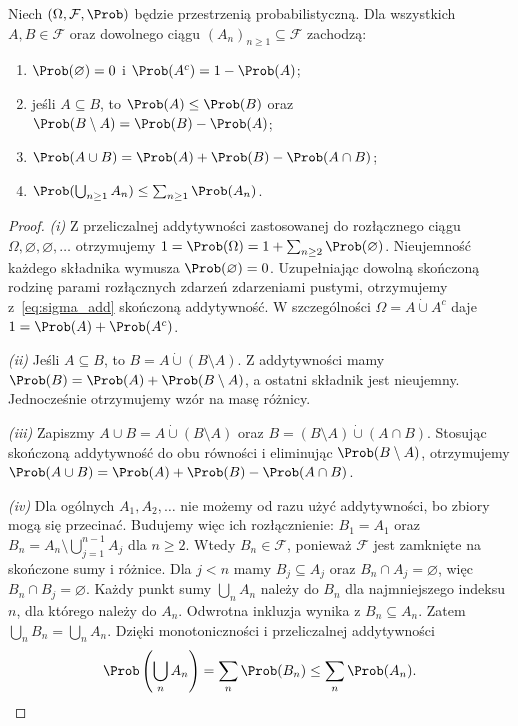 \begin{twierdzenie}
Niech $(\Omega,\mathcal F,\Prob)$ będzie przestrzenią probabilistyczną.
Dla wszystkich $A,B\in\mathcal F$ oraz dowolnego ciągu
$(A_n)_{n\geq1}\subseteq\mathcal F$ zachodzą:
\begin{enumerate}[label=(\roman*)]
\item $\Prob(\varnothing)=0$ i $\Prob(A^c)=1-\Prob(A)$;
\item jeśli $A\subseteq B$, to $\Prob(A)\leq\Prob(B)$ oraz
      $\Prob(B\setminus A)=\Prob(B)-\Prob(A)$;
\item $\Prob(A\cup B)=\Prob(A)+\Prob(B)-\Prob(A\cap B)$;
\item $\Prob(\bigcup_{n\geq1}A_n)\leq\sum_{n\geq1}\Prob(A_n)$.
\end{enumerate}
\end{twierdzenie}
\begin{proof}
\emph{(i)} Z przeliczalnej addytywności zastosowanej do
rozłącznego ciągu $\Omega,\varnothing,\varnothing,\ldots$
otrzymujemy
$1=\Prob(\Omega)=1+\sum_{n\geq2}\Prob(\varnothing)$.
Nieujemność każdego składnika wymusza
$\Prob(\varnothing)=0$. Uzupełniając dowolną skończoną rodzinę
parami rozłącznych zdarzeń zdarzeniami pustymi, otrzymujemy
z~\eqref{eq:sigma_add} skończoną addytywność. W szczególności
$\Omega=A\mathbin{\dot\cup}A^c$ daje
$1=\Prob(A)+\Prob(A^c)$.

\emph{(ii)} Jeśli $A\subseteq B$, to
$B=A\mathbin{\dot\cup}(B\setminus A)$.
Z addytywności mamy
$\Prob(B)=\Prob(A)+\Prob(B\setminus A)$, a ostatni
składnik jest nieujemny. Jednocześnie otrzymujemy wzór
na masę różnicy.

\emph{(iii)} Zapiszmy
$A\cup B=A\mathbin{\dot\cup}(B\setminus A)$ oraz
$B=(B\setminus A)\mathbin{\dot\cup}(A\cap B)$.
Stosując skończoną addytywność do obu równości i
eliminując $\Prob(B\setminus A)$, otrzymujemy
$\Prob(A\cup B)=\Prob(A)+\Prob(B)-\Prob(A\cap B)$.

\emph{(iv)} Dla ogólnych $A_1,A_2,\ldots$ nie możemy
od razu użyć addytywności, bo zbiory mogą się przecinać.
Budujemy więc ich rozłącznienie: $B_1=A_1$ oraz
$B_n=A_n\setminus\bigcup_{j=1}^{n-1}A_j$ dla $n\geq2$.
Wtedy $B_n\in\mathcal F$, ponieważ $\mathcal F$ jest zamknięte
na skończone sumy i różnice. Dla $j<n$ mamy $B_j\subseteq A_j$
oraz $B_n\cap A_j=\varnothing$, więc $B_n\cap B_j=\varnothing$.
Każdy punkt sumy $\bigcup_n A_n$ należy do $B_n$ dla najmniejszego
indeksu $n$, dla którego należy do $A_n$. Odwrotna inkluzja
wynika z $B_n\subseteq A_n$. Zatem $\bigcup_n B_n=\bigcup_n A_n$.
Dzięki monotoniczności i przeliczalnej addytywności
\[
\Prob\left(\bigcup_n A_n\right)
=\sum_n\Prob(B_n)\leq\sum_n\Prob(A_n).
\]
\end{proof}

